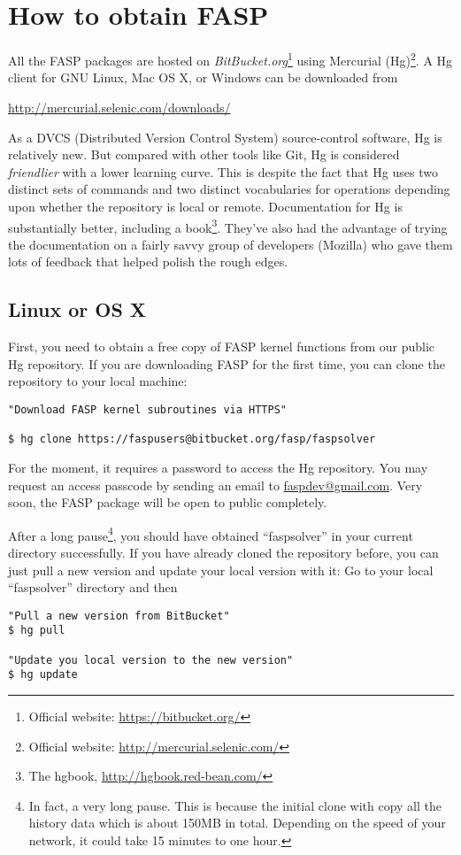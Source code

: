 \documentclass[11pt]{memoir}
\begin{document}
\section{How to obtain FASP}\label{sec:install}

All the FASP packages are hosted on \emph{BitBucket.org}\footnote{Official website: \url{https://bitbucket.org/}} using Mercurial (Hg)\footnote{Official website: \url{http://mercurial.selenic.com/}}. A Hg client for GNU Linux, Mac OS X, or Windows can be downloaded from 
\begin{center}
  \url{http://mercurial.selenic.com/downloads/} 
\end{center}


As a DVCS (Distributed Version Control System) source-control software, Hg is relatively new. But compared with other tools like Git, Hg is considered \emph{friendlier} with a lower learning curve. This is despite the fact that Hg uses two distinct sets of commands and two distinct vocabularies for operations depending upon whether the repository is local or remote.
Documentation for Hg is substantially better, including a book\footnote{The hgbook, \url{http://hgbook.red-bean.com/}}. They've also had the advantage of trying the documentation on a fairly savvy group of developers (Mozilla) who gave them lots of feedback that helped polish the rough edges.

\subsection{Linux or OS X}
First, you need to obtain a free copy of FASP kernel functions from our public Hg repository. If you are downloading FASP for the first time, you can clone the repository to your local machine:
%
\begin{lstlisting}[numbers=none]
"Download FASP kernel subroutines via HTTPS"

$ hg clone https://faspusers@bitbucket.org/fasp/faspsolver
\end{lstlisting}
%
\begin{snugshade}\noindent
For the moment, it requires a password to access the Hg repository. You may request an access passcode by sending an email to \url{faspdev@gmail.com}. Very soon, the FASP package will be open to public completely.
\end{snugshade}

After a long pause\footnote{In fact, a very long pause. This is because the initial clone with copy all the history data which is about 150MB in total. Depending on the speed of your network, it could take 15 minutes to one hour.}, you should have obtained ``faspsolver'' in your current directory successfully. If you have already cloned the repository before, you can just pull a new version and update your local version with it: Go to your local ``faspsolver'' directory and then
%
\begin{lstlisting}[numbers=none]
"Pull a new version from BitBucket"
$ hg pull

"Update you local version to the new version"
$ hg update
\end{lstlisting}
%
\end{document}
